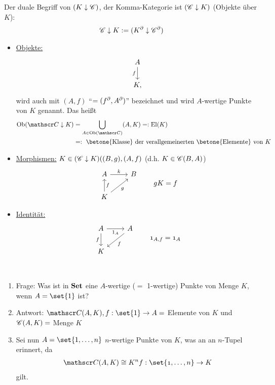 \begin{folg}
	Der duale Begriff von $(K \downarrow \mathscr C)$, der Komma-Kategorie ist $(\mathscr C \downarrow K)$ (Objekte über $K$): 
	\begin{align*}
		\mathscr C \downarrow K := (K^{\partial} \downarrow \mathscr C^{\partial})
	\end{align*}
	\begin{itemize}
		\item \ul{Objekte:}
		\begin{align*}
			\begin{tikzcd}
				A \arrow[d, "f"'] \\ K,
			\end{tikzcd} 
		\end{align*}
		wird auch mit $(A,f)$ ``$= (f^{\partial}, A^{\partial})$'' bezeichnet und wird $A$-wertige Punkte von $K$ genannt. Das heißt
		\begin{align*}
			\Ob(\Cat \downarrow K) &= \bigcup_{A \in \Ob(\Cat)}(A,K) =: \El(K)\\
			&=: \text{ \betone{Klasse} der verallgemeinerten \betone{Elemente} von } K 
		\end{align*}
		\item \ul{Morphismen:} $K \in (\mathscr C \downarrow K)((B,g),(A,f)$ (d.h. $K \in \mathscr C(B,A)$)
		\begin{align*}
			\begin{tikzcd}[ampersand replacement=\&]
				A \arrow[r, "k"] \& B\\
				K \arrow[u, "f"'] \arrow[ur, "g"'] 
			\end{tikzcd} \qquad \mit gK = f
		\end{align*}
		\item \ul{Identität:}
		\begin{align*}
			\begin{tikzcd}[ampersand replacement=\&]
				A \arrow[d, "f"'] \arrow[r, "1_A"'] \& A \arrow[dl, "f"] \\
				K 
			\end{tikzcd}
			\qquad \mit 1_{A,f} = 1_A
		\end{align*}
	\end{itemize}
\end{folg}

\begin{bemerkung}\
	\begin{enumerate}[label=] %
		\item Frage:  Was ist in $\operatorname{\mathbf{Set}}$ eine $A$-wertige ($=$ 1-wertige) Punkte von Menge $K$, wenn $A = \set{1}$ ist?
		\item Antwort: $\Cat(A,K), f: \set{1} \to A=$ Elemente von $K$ und $\mathscr C(A,K) = $ Menge $K$ %
		\item Sei nun $A = \set{1,\dots, n}$ $n$-wertige Punkte von $K$, was an an $n$-Tupel erinnert, da
		\begin{align*}
			\Cat(A,K) \cong K^n \mit f: \set{1, \dots, n} \to K
		\end{align*}
		gilt.
	\end{enumerate}
\end{bemerkung}